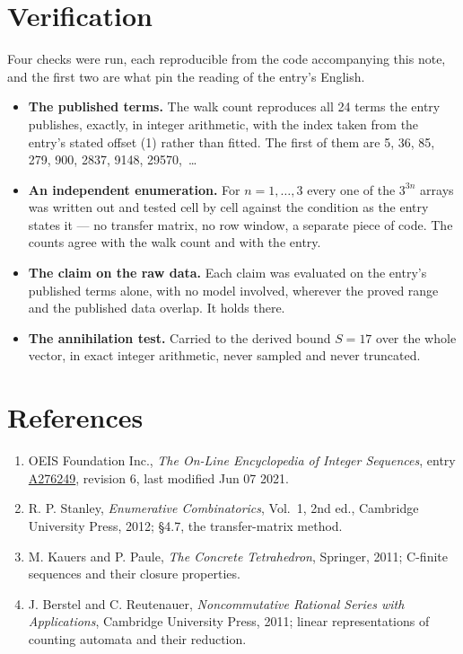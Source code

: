 \documentclass[11pt]{article}
\theoremstyle{definition}
\begin{document}
\section{Verification}

Four checks were run, each reproducible from the code accompanying this note, and the first two are what pin the reading of the entry's English.

\begin{itemize}

\item {\bfseries The published terms.} The walk count reproduces all 24 terms the entry publishes, exactly, in integer arithmetic, with the index taken from the entry's stated offset (1) rather than fitted. The first of them are 5, 36, 85, 279, 900, 2837, 9148, 29570,~\dots

\item {\bfseries An independent enumeration.} For $n = 1,\dots,3$ every one of the $3^{3n}$ arrays was written out and tested cell by cell against the condition as the entry states it --- no transfer matrix, no row window, a separate piece of code. The counts agree with the walk count and with the entry.

\item {\bfseries The claim on the raw data.} Each claim was evaluated on the entry's published terms alone, with no model involved, wherever the proved range and the published data overlap. It holds there.

\item {\bfseries The annihilation test.} Carried to the derived bound $S = 17$ over the whole vector, in exact integer arithmetic, never sampled and never truncated.

\end{itemize}

\section{References}

\begin{enumerate}

\item OEIS Foundation Inc., \emph{The On-Line Encyclopedia of Integer Sequences}, entry \href{https://oeis.org/A276249}{A276249}, revision 6, last modified Jun 07 2021.

\item R. P. Stanley, \emph{Enumerative Combinatorics}, Vol.~1, 2nd ed., Cambridge University Press, 2012; \S4.7, the transfer-matrix method.

\item M. Kauers and P. Paule, \emph{The Concrete Tetrahedron}, Springer, 2011; C-finite sequences and their closure properties.

\item J. Berstel and C. Reutenauer, \emph{Noncommutative Rational Series with Applications}, Cambridge University Press, 2011; linear representations of counting automata and their reduction.

\end{enumerate}
\end{document}
